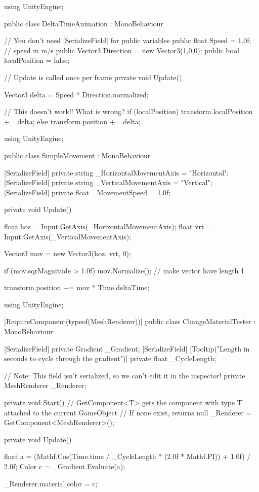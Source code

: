 \documentclass[11pt]{article}
\def\StartLineAt#1{\lstset{firstnumber=#1}}
\begin{document}
\StartLineAt{1}
\begin{csharp}
using UnityEngine;

public class DeltaTimeAnimation : MonoBehaviour
{
    // You don't need [SerializeField] for public variables
    public float Speed = 1.0f; // speed in m/s
    public Vector3 Direction = new Vector3(1,0,0);
    public bool localPosition = false;

    // Update is called once per frame
    private void Update()
    {
        Vector3 delta = Speed * Direction.normalized;

        // This doesn't work!!  What is wrong?
        if (localPosition)
            transform.localPosition += delta;
        else
            transform.position += delta;
    }
}
\end{csharp}

\StartLineAt{1}
\begin{csharp}
using UnityEngine;

public class SimpleMovement : MonoBehaviour
{
    [SerializeField]
    private string _HorizontalMovementAxis = "Horizontal";
    [SerializeField]
    private string _VerticalMovementAxis = "Vertical";
    [SerializeField]
    private float _MovementSpeed = 1.0f;

    private void Update()
    {
        float hoz = Input.GetAxis(_HorizontalMovementAxis);
        float vrt = Input.GetAxis(_VerticalMovementAxis);

        Vector3 mov = new Vector3(hoz, vrt, 0);

        if (mov.sqrMagnitude > 1.0f)
            mov.Normalize(); // make vector have length 1

        transform.position += mov * Time.deltaTime;
    }
}
\end{csharp}

\StartLineAt{1}
\begin{csharp}
using UnityEngine;

[RequireComponent(typeof(MeshRenderer))]
public class ChangeMaterialTester : MonoBehaviour
{
    [SerializeField]
    private Gradient _Gradient;
    [SerializeField]
    [Tooltip("Length in seconds to cycle through the gradient")]
    private float _CycleLength;

    // Note: This field isn't serialized, so we can't edit it in the inspector!
    private MeshRenderer _Renderer;

    private void Start()
    {
        // GetComponent<T> gets the component with type T attached to the current GameObject
        // If none exist, returns null
        _Renderer = GetComponent<MeshRenderer>();
    }

    private void Update()
    {
        float a = (Mathf.Cos(Time.time / _CycleLength * (2.0f * Mathf.PI)) + 1.0f) / 2.0f;
        Color c = _Gradient.Evaluate(a);

        _Renderer.material.color = c;
    }
}
\end{csharp}
\end{document}
